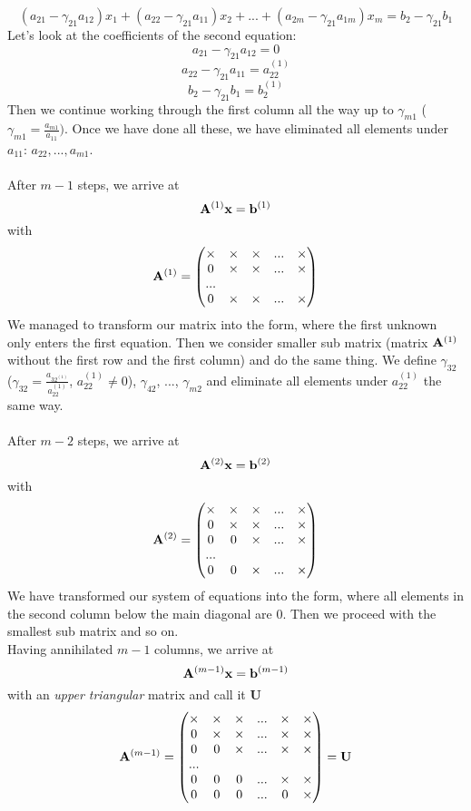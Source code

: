 \documentclass{article}
\begin{document}
\[
(a_{21}-\gamma_{21}a_{12})x_1 + (a_{22}-\gamma_{21}a_{11})x_2 + ... + (a_{2m}-\gamma_{21}a_{1m})x_m = b_2-\gamma_{21}b_1
\]
Let's look at the coefficients of the second equation:
\[
a_{21}-\gamma_{21}a_{12}=0
\]
\[
a_{22}-\gamma_{21}a_{11}=a_{22}^{(1)}
\]
\[
b_2-\gamma_{21}b_1 = b_2^{(1)}
\]
Then we continue working through the first column all the way up to \(\gamma_{m1}\) (\(\gamma_{m1} = \frac{a_{m1}}{a_{11}})\). Once we have done all these, we have eliminated all elements under $a_{11}$: $a_{22}, ..., a_{m1}$.\\
\\After $m-1$ steps, we arrive at
\[
{\bf A}^{(1)}{\bf x} = {\bf b}^{(1)}
\]
with
\[
{\bf A}^{(1)}=
\begin{pmatrix}
    \times & \times & \times & ... & \times\\
    0 & \times & \times & ... & \times\\
    ...\\
    0 & \times & \times & ... & \times
\end{pmatrix}
\]
We managed to transform our matrix into the form, where the first unknown only enters the first equation. Then we consider smaller sub matrix (matrix \({\bf A}^{(1)}\) without the first row and the first column) and do the same thing. We define \(\gamma_{32}\) (\(\gamma_{32} = \frac{a_{32^{(1)}}}{a_{22}^{(1)}}\), \(a_{22}^{(1)} \neq 0\)), \(\gamma_{42}\), ..., \(\gamma_{m2}\) and eliminate all elements under \(a_{22}^{(1)}\) the same way.\\
\\After $m-2$ steps, we arrive at
\[
{\bf A}^{(2)}{\bf x} = {\bf b}^{(2)}
\]
with
\[
{\bf A}^{(2)} =
\begin{pmatrix}
    \times & \times & \times & ... & \times\\
    0 & \times & \times & ... & \times\\
    0 & 0 & \times & ... & \times\\
    ...\\
    0 & 0 & \times & ... & \times
\end{pmatrix}
\]
We have transformed our system of equations into the form, where all elements in the second column below the main diagonal are 0. Then we proceed with the smallest sub matrix and so on.\\
Having annihilated $m-1$ columns, we arrive at
\[
{\bf A}^{(m-1)}{\bf x} = {\bf b}^{(m-1)}
\]
with an {\it upper triangular} matrix and call it {\bf U}
\[
{\bf A}^{(m-1)} =
\begin{pmatrix}
    \times & \times & \times & ... & \times & \times\\
    0 & \times & \times & ... & \times & \times\\
    0 & 0 & \times & ... & \times & \times\\
    ...\\
    0 & 0 & 0 & ... & \times & \times\\
    0 & 0 & 0 & ... & 0 & \times
\end{pmatrix}
={\bf U}
\]
\end{document}

